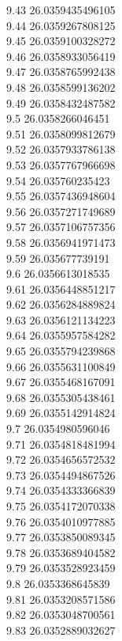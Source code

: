 {9.43	26.0359435496105\\
9.44	26.0359267808125\\
9.45	26.0359100328272\\
9.46	26.0358933056419\\
9.47	26.0358765992438\\
9.48	26.0358599136202\\
9.49	26.0358432487582\\
9.5	26.0358266046451\\
9.51	26.0358099812679\\
9.52	26.0357933786138\\
9.53	26.0357767966698\\
9.54	26.035760235423\\
9.55	26.0357436948604\\
9.56	26.0357271749689\\
9.57	26.0357106757356\\
9.58	26.0356941971473\\
9.59	26.035677739191\\
9.6	26.0356613018535\\
9.61	26.0356448851217\\
9.62	26.0356284889824\\
9.63	26.0356121134223\\
9.64	26.0355957584282\\
9.65	26.0355794239868\\
9.66	26.0355631100849\\
9.67	26.0355468167091\\
9.68	26.0355305438461\\
9.69	26.0355142914824\\
9.7	26.0354980596046\\
9.71	26.0354818481994\\
9.72	26.0354656572532\\
9.73	26.0354494867526\\
9.74	26.0354333366839\\
9.75	26.0354172070338\\
9.76	26.0354010977885\\
9.77	26.0353850089345\\
9.78	26.0353689404582\\
9.79	26.0353528923459\\
9.8	26.0353368645839\\
9.81	26.0353208571586\\
9.82	26.0353048700561\\
9.83	26.0352889032627\\
}
